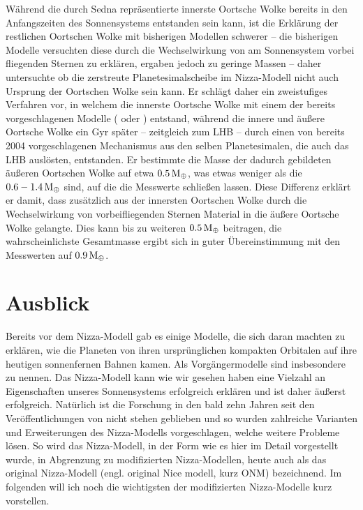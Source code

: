 \documentclass[12pt,a4paper,twoside]{article}
\renewcommand{\cite}{\citep}
\newcommand{\ME}{M_\oplus}
\begin{document}
Während die durch Sedna repräsentierte innerste Oortsche Wolke bereits in den Anfangszeiten des Sonnensystems entstanden sein kann, ist die Erklärung der restlichen Oortschen Wolke mit bisherigen Modellen schwerer – die bisherigen Modelle versuchten diese durch die Wechselwirkung von am Sonnensystem vorbei fliegenden Sternen zu erklären, ergaben jedoch zu geringe Massen – daher untersuchte \cite{Brasser2008} ob die zerstreute Planetesimalscheibe im Nizza-Modell nicht auch Ursprung der Oortschen Wolke sein kann.
Er schlägt daher ein zweistufiges Verfahren vor, in welchem die innerste Oortsche Wolke mit einem der bereits vorgeschlagenen Modelle (\cite{Brasser2006,Brasser2007} oder \cite{Kaib2008}) entstand, während die innere und äußere Oortsche Wolke ein Gyr später – zeitgleich zum LHB – durch einen von \cite{Dones2004} bereits 2004 vorgeschlagenen Mechanismus aus den selben Planetesimalen, die auch das LHB auslösten, entstanden\cite{Brasser2008}.
Er bestimmte die Masse der dadurch gebildeten äußeren Oortschen Wolke auf etwa $\unit[0.5]{\ME}$, was etwas weniger als die $\unit[0.6-1.4]{\ME}$ sind, auf die die Messwerte schließen lassen\cite{Brasser2008}. Diese Differenz erklärt er damit, dass zusätzlich aus der innersten Oortschen Wolke durch die Wechselwirkung von vorbeifliegenden Sternen Material in die äußere Oortsche Wolke gelangte\cite{Brasser2008}.
Dies kann bis zu weiteren $\unit[0.5]{\ME}$ beitragen, die wahrscheinlichste Gesamtmasse ergibt sich in guter Übereinstimmung mit den Messwerten auf $\unit[0.9]{\ME}$\cite{Brasser2008}.

\section{Ausblick}\label{erweiterungen}
Bereits vor dem Nizza-Modell gab es einige Modelle, die sich daran machten zu erklären, wie die Planeten von ihren ursprünglichen kompakten Orbitalen auf ihre heutigen sonnenfernen Bahnen kamen. Als Vorgängermodelle sind insbesondere \cite{Thommes1999,Thommes2003,Levison2004} zu nennen. %
Das Nizza-Modell kann wie wir gesehen haben eine Vielzahl an Eigenschaften unseres Sonnensystems erfolgreich erklären und ist daher äußerst erfolgreich.
Natürlich ist die Forschung in den bald zehn Jahren seit den Veröffentlichungen von \cite{Tsiganis2005,Morbidelli2005,Gomes2005} nicht stehen geblieben und so wurden zahlreiche Varianten und Erweiterungen des Nizza-Modells vorgeschlagen, welche weitere Probleme lösen.
So wird das Nizza-Modell, in der Form wie es hier im Detail vorgestellt wurde, in Abgrenzung zu modifizierten Nizza-Modellen, heute auch als das original Nizza-Modell (engl. \glqq original Nice modell\grqq, kurz ONM) bezeichnend.
Im folgenden will ich noch die wichtigsten der modifizierten Nizza-Modelle kurz vorstellen. %
\end{document}
